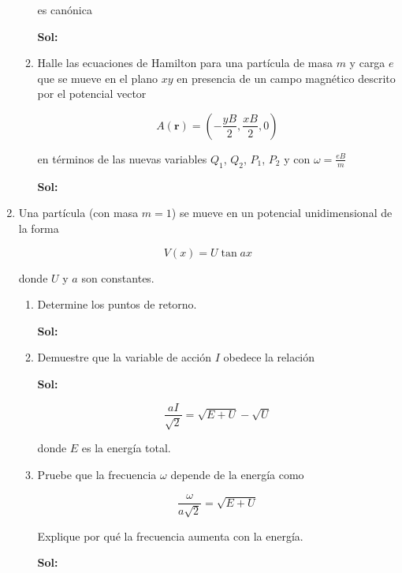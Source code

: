 \documentclass[12pt,a4paper]{article}
\begin{document}
\begin{enumerate}
\begin{enumerate}
    es canónica
    
    \textbf{Sol:}
    
    \item Halle las ecuaciones de Hamilton para una partícula de masa $m$ y carga $e$ que se mueve en el plano $xy$ en presencia de un campo magnético descrito por el potencial vector
    
    \begin{equation*}
        A(\mathbf{r}) = \left(- \frac{yB}{2} , \frac{xB}{2},0\right)
    \end{equation*}
    
    en términos de las nuevas variables $Q_1$, $Q_2$, $P_1$, $P_2$ y con $\omega = \frac{eB}{m}$
    
    \textbf{Sol:}
    
    
\end{enumerate}






\item Una partícula (con masa $m=1$) se mueve en un potencial unidimensional de la forma

\begin{equation*}
    V(x) = U \tan{ax}
\end{equation*}

donde $U$ y $a$ son constantes.

\begin{enumerate}
    \item Determine los puntos de retorno.
    
    \textbf{Sol:}
    
    \item Demuestre que la variable de acción $I$ obedece la relación
    
    \textbf{Sol:}
    
    \begin{equation*}
        \frac{aI}{\sqrt{2}} = \sqrt{E + U} - \sqrt{U}
    \end{equation*}
    
    donde $E$ es la energía total.
    
    \item Pruebe que la frecuencia $\omega$ depende de la energía como
    
    \begin{equation*}
        \frac{\omega}{a \sqrt{2}} = \sqrt{E+U}
    \end{equation*}
    
    Explique por qué la frecuencia aumenta con la energía.
    
    \textbf{Sol:}
    
\end{enumerate}
    
    
\end{enumerate}
\end{document}
